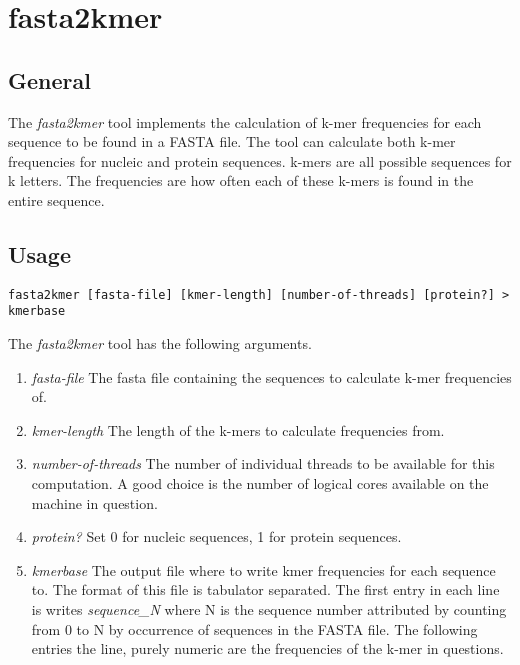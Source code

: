\section{fasta2kmer} \label{sec-fasta2kmer}

\subsection{General}

The \emph{fasta2kmer} tool implements the calculation of k-mer
frequencies for each sequence to be found in a FASTA \cite{fasta}
file. The tool can calculate both k-mer frequencies for nucleic and
protein sequences. k-mers are all possible sequences for k
letters. The frequencies are how often each of these k-mers is found
in the entire sequence.

\subsection{Usage}

\begin{lstlisting}
fasta2kmer [fasta-file] [kmer-length] [number-of-threads] [protein?] > kmerbase
\end{lstlisting}
The \emph{fasta2kmer} tool has the following arguments.
\begin{enumerate}
  \item \emph{fasta-file} The fasta file containing the sequences to
    calculate k-mer frequencies of.
  \item \emph{kmer-length} The length of the k-mers to calculate
    frequencies from.
  \item \emph{number-of-threads} The number of individual threads to
    be available for this computation. A good choice is the number of
    logical cores available on the machine in question.
  \item \emph{protein?} Set 0 for nucleic sequences, 1 for protein
    sequences.
  \item \emph{kmerbase} The output file where to write kmer frequencies
    for each sequence to. The format of this file is tabulator
    separated. The first entry in each line is writes
    \emph{sequence\_N} where N is the sequence number attributed by
    counting from 0 to N by occurrence of sequences in the FASTA
    file. The following entries the line, purely numeric are the
    frequencies of the k-mer in questions.
\end{enumerate}


